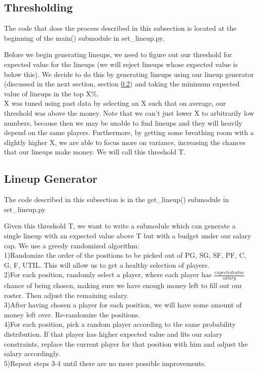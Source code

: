 \documentclass[12pt]{article}
\renewcommand{\=}[1]{\stackrel{#1}{=}} %
\theoremstyle{definition}
\begin{document}
\subsection{Thresholding}
The code that does the process described in this subsection is located at the beginning of the main() submodule in set\_lineup.py. 

Before we begin generating lineups, we need to figure out our threshold for expected value for the lineups (we will reject lineups whose expected value is below this).  We decide to do this by generating lineups using our lineup generator (discussed in the next section, section \ref{ge}) and taking the minimum expected value of lineups in the top X\%.  \\

X was tuned using past data by selecting an X such that on average, our threshold was above the money.  Note that we can't just lower X to arbitrarily low numbers, because then we may be unable to find lineups and they will heavily depend on the same players.  Furthermore, by getting some breathing room with a slightly higher X, we are able to focus more on variance, increasing the chances that our lineups make money.  We will call this threshold T.  \\

\subsection{Lineup Generator}
\label{ge}
The code described in this subsection is in the get\_lineup() submodule in set\_lineup.py 

Given this threshold T, we want to write a submodule which can generate a single lineup with an expected value above T but with a budget under our salary cap.  We use a greedy randomized algorithm:\\

1)Randomize the order of the positions to be picked out of PG, SG, SF, PF, C, G, F, UTIL.  This will allow us to get a healthy selection of players.  \\
2)For each position, randomly select a player, where each player has $\frac{expected value}{salary}$ chance of being chosen, making sure we have enough money left to fill out our roster.  Then adjust the remaining salary.\\
3)After having chosen a player for each position, we will have some amount of money left over.  Re-randomize the positions.\\
4)For each position, pick a random player according to the same probability distribution.  If that player has higher expected value and fits our salary constraints, replace the current player for that position with him and adjust the salary accordingly.  \\
5)Repeat steps 3-4 until there are no more possible improvements.\\
\end{document}
